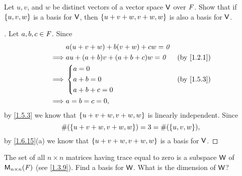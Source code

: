 \begin{ex}\label{ex:1.6.12}
  Let \(u, v\), and \(w\) be distinct vectors of a vector space \(\mathsf{V}\) over \(\mathit{F}\).
  Show that if \(\left\lbrace u, v, w\right\rbrace\) is a basis for \(\mathsf{V}\), then \(\left\lbrace u + v + w, v + w, w\right\rbrace\) is also a basis for \(\mathsf{V}\).
\end{ex}

\begin{proof}[]
  Let \(a, b, c \in \mathit{F}\).
  Since
  \begin{align*}
             & a(u + v + w) + b(v + w) + cw = \zv                               \\
    \implies & au + (a + b)v + (a + b + c)w = \zv &  & \text{(by \cref{1.2.1})} \\
    \implies & \begin{dcases}
      a = 0     \\
      a + b = 0 \\
      a + b + c = 0
    \end{dcases}         &  & \text{(by \cref{1.5.3})} \\
    \implies & a = b = c = 0,
  \end{align*}
  by \cref{1.5.3} we know that \(\left\lbrace u + v + w, v + w, w\right\rbrace\) is linearly independent.
  Since
  \[
    \#(\left\lbrace u + v + w, v + w, w\right\rbrace) = 3 = \#(\left\lbrace u, v, w\right\rbrace),
  \]
  by \cref{1.6.15}(a) we know that \(\left\lbrace u + v + w, v + w, w\right\rbrace\) is a basis for \(\mathsf{V}\).
\end{proof}

\setcounter{ex}{14}
\begin{ex}\label{ex:1.6.15}
  The set of all \(n \times n\) matrices having trace equal to zero is a subspace \(\mathsf{W}\) of \(\mathsf{M}_{{n} \times n}({\mathit{F}})\) (see \cref{1.3.9}).
  Find a basis for \(\mathsf{W}\).
  What is the dimension of \(\mathsf{W}\)?
\end{ex}

